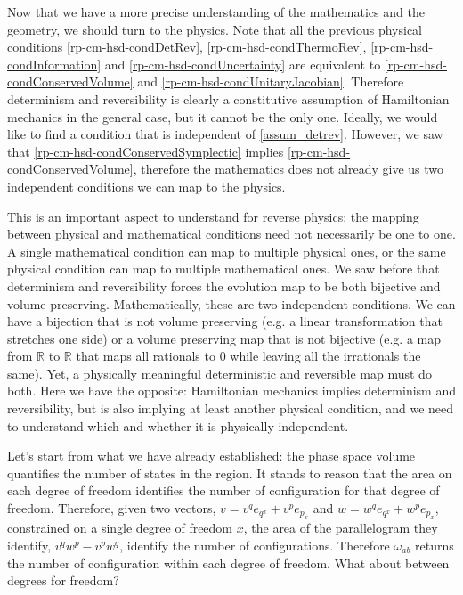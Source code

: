 Now that we have a more precise understanding of the mathematics and the geometry, we should turn to the physics. Note that all the previous physical conditions \ref{rp-cm-hsd-condDetRev}, \ref{rp-cm-hsd-condThermoRev}, \ref{rp-cm-hsd-condInformation} and \ref{rp-cm-hsd-condUncertainty} are equivalent to \ref{rp-cm-hsd-condConservedVolume} and \ref{rp-cm-hsd-condUnitaryJacobian}. Therefore determinism and reversibility is clearly a constitutive assumption of Hamiltonian mechanics in the general case, but it cannot be the only one. Ideally, we would like to find a condition that is independent of \ref{assum_detrev}. However, we saw that \ref{rp-cm-hsd-condConservedSymplectic} implies \ref{rp-cm-hsd-condConservedVolume}, therefore the mathematics does not already give us two independent conditions we can map to the physics.

This is an important aspect to understand for reverse physics: the mapping between physical and mathematical conditions need not necessarily be one to one. A single mathematical condition can map to multiple physical ones, or the same physical condition can map to multiple mathematical ones. We saw before that determinism and reversibility forces the evolution map to be both bijective and volume preserving. Mathematically, these are two independent conditions. We can have a bijection that is not volume preserving (e.g. a linear transformation that stretches one side) or a volume preserving map that is not bijective (e.g. a map from $\mathbb{R}$ to $\mathbb{R}$ that maps all rationals to $0$ while leaving all the irrationals the same). Yet, a physically meaningful deterministic and reversible map must do both. Here we have the opposite: Hamiltonian mechanics implies determinism and reversibility, but is also implying at least another physical condition, and we need to understand which and whether it is physically independent.

Let's start from what we have already established: the phase space volume quantifies the number of states in the region. It stands to reason that the area on each degree of freedom identifies the number of configuration for that degree of freedom. Therefore, given two vectors, $v = v^q e_{q^x} + v^p e_{p_x}$ and $w = w^q e_{q^x} + w^p e_{p_x}$, constrained on a single degree of freedom $x$, the area of the parallelogram they identify, $v^q w^p - v^p w^q$, identify the number of configurations. Therefore $\omega_{ab}$ returns the number of configuration within each degree of freedom. What about between degrees for freedom?

